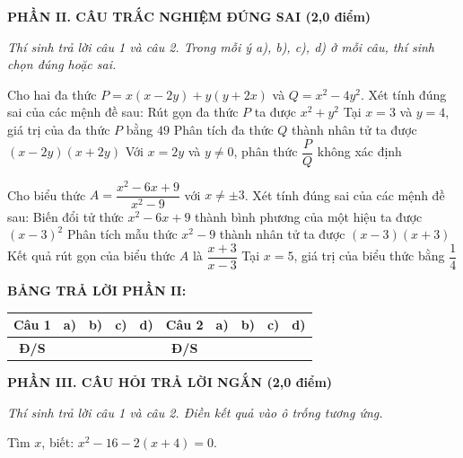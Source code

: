 \documentclass[12pt,a4paper]{article}
\begin{document}
\setcounter{ex}{0}
\noindent\textbf{\large PHẦN II. CÂU TRẮC NGHIỆM ĐÚNG SAI (2,0 điểm)}

\textit{Thí sinh trả lời câu 1 và câu 2. Trong mỗi ý a), b), c), d) ở mỗi câu, thí sinh chọn đúng hoặc sai.}

\vspace{1mm}
\begin{ex}
Cho hai đa thức $P = x(x - 2y) + y(y + 2x)$ và $Q = x^2 - 4y^2$. Xét tính đúng sai của các mệnh đề sau:
\choiceTF
{\True Rút gọn đa thức $P$ ta được $x^2 + y^2$}
{Tại $x = 3$ và $y = 4$, giá trị của đa thức $P$ bằng $49$}
{\True Phân tích đa thức $Q$ thành nhân tử ta được $(x - 2y)(x + 2y)$}
{\True Với $x = 2y$ và $y \neq 0$, phân thức $\dfrac{P}{Q}$ không xác định}
\end{ex}

\begin{ex}
Cho biểu thức $A = \dfrac{x^2 - 6x + 9}{x^2 - 9}$ với $x \neq \pm 3$. Xét tính đúng sai của các mệnh đề sau:
\choiceTF
{\True Biến đổi tử thức $x^2 - 6x + 9$ thành bình phương của một hiệu ta được $(x - 3)^2$}
{\True Phân tích mẫu thức $x^2 - 9$ thành nhân tử ta được $(x - 3)(x + 3)$}
{Kết quả rút gọn của biểu thức $A$ là $\dfrac{x + 3}{x - 3}$}
{\True Tại $x = 5$, giá trị của biểu thức bằng $\dfrac{1}{4}$}
\end{ex}


\noindent\textbf{BẢNG TRẢ LỜI PHẦN II:}
\begin{center}
\begin{tabular}{|c|c|c|c|c||c|c|c|c|c|}
\hline
\textbf{Câu 1} & \textbf{a)} & \textbf{b)} & \textbf{c)} & \textbf{d)} & \textbf{Câu 2} & \textbf{a)} & \textbf{b)} & \textbf{c)} & \textbf{d)} \\
\hline
\textbf{Đ/S} & \rule{0pt}{0.6cm} & & & & \textbf{Đ/S} & & & & \\
\hline
\end{tabular}
\end{center}
\vspace{2mm}

\setcounter{ex}{0}
\noindent\textbf{\large PHẦN III. CÂU HỎI TRẢ LỜI NGẮN (2,0 điểm)}

\textit{Thí sinh trả lời câu 1 và câu 2. Điền kết quả vào ô trống tương ứng.}

\vspace{1mm}
\begin{ex}
Tìm $x$, biết: $x^2 - 16 - 2(x + 4) = 0$. 
\end{ex}
\end{document}
